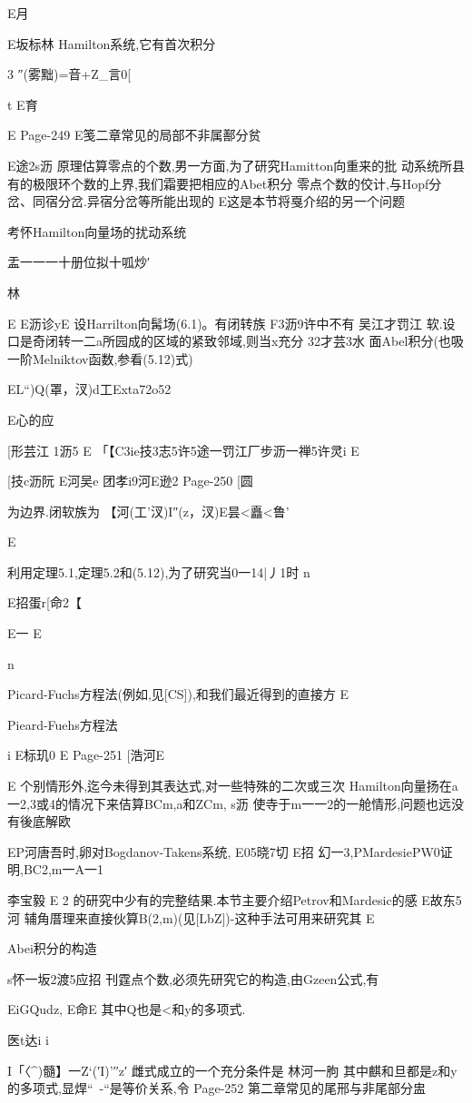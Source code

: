 {{{{{{{{{{{{{{{E月

E坂标林
Hamilton系统,它有首次积分

3
″(雾黜)=音+Z_言0[

t
E育

E
Page-249
E笺二章常见的局部不非属鄯分贫

E途2s沥
原理估算零点的个数,男一方面,为了研究Hamitton向重来的批
动系统所县有的极限环个数的上界,我们霜要把相应的Abet积分
零点个数的佼计,与Hopf分岔、同宿分岔.异宿分岔等所能出现的
E这是本节将戛介绍的另一个问题

考怀Hamilton向量场的扰动系统

盂一一一十册位拟十呱炒′

林

E
E沥诊yE
设Harrilton向髯场(6.1)。有闭转族
F3沥9许中不有
吴江才罚江
软.设口是奇闭转一二a所园成的区域的紧致邻域,则当x充分
32才芸3水
面Abel积分(也吸一阶Melniktov函数,参看(5.12)式)

EL“)Q(罩，汊)d工Exta72o52

E心的应

[形芸江
1沥5
E
「【C3ie技3志5许5途一罚江厂步沥一禅5许灵i
E

[技c沥阮
E河吴e
团孝i9河E逊2
Page-250
[圆

为边界.闭软族为
【河{(工'汊)I″(z，汊)E昙<矗<鲁}'

E

利用定理5.1,定理5.2和(5.12),为了研究当0一14|丿1时
n

E招蛋r[命2【

E一
E

n

Picard-Fuchs方程法(例如,见[CS]),和我们最近得到的直接方
E

Pieard-Fuehs方程法

i
E标玑0
E
Page-251
[浩河E

E
个别情形外,迄今未得到其表达式,对一些特殊的二次或三次
Hamilton向量扬在a一2,3或4的情况下来佶算BCm,a和ZCm,
s沥
使寺于m一一2的一舱情形,问题也远没有後底解欧

EP河唐吾时,卵对Bogdanov-Takens系统,
E05晓7切
E招
幻一3,PMardesiePW0证明,BC2,m一A一1}李宝毅
E
2
的研究中少有的完整结果.本节主要介绍Petrov和Mardesic的感
E故东5河
辅角厝理来直接伙算B(2,m)(见[LbZ])-这种手法可用来研究其
E

Abei积分的构造

s怀一坂2渡5应招
刊霆点个数,必须先研究它的构造,由Gzeen公式,有

EiGQudz,
E命E
其中Q也是<和y的多项式.

医t达i
i

I「〈^)髓】一Z`(′I)'′′z′
雌式成立的一个充分条件是
林河一朐
其中麒和旦都是z和y的多项式,显焊“~-“是等价关系,令
Page-252
第二章常见的尾邢与非尾部分盅

}}}}}}}}}}}}}}
